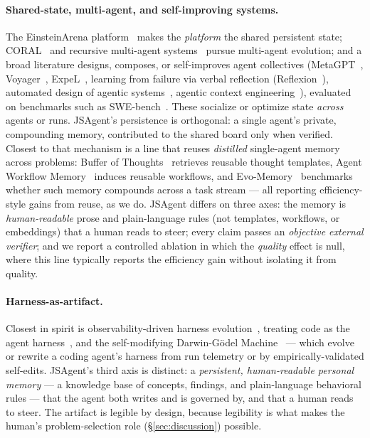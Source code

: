 \documentclass[11pt]{article}
\begin{document}
\paragraph{Shared-state, multi-agent, and self-improving systems.}
The EinsteinArena platform~\cite{bianchi2026einstein,togetherai2026arena} makes the
\emph{platform} the shared persistent state; CORAL~\cite{qu2026coral} and recursive multi-agent
systems~\cite{zou2026recursivemas} pursue multi-agent evolution; and a broad literature
designs, composes, or self-improves agent collectives
(MetaGPT~\cite{hong2023metagpt}, Voyager~\cite{wang2023voyager}, ExpeL~\cite{zhao2023expel},
learning from failure via verbal reflection (Reflexion~\cite{shinn2023reflexion}),
automated design of agentic systems~\cite{hu2024ads}, agentic context
engineering~\cite{zhang2025ace}), evaluated on benchmarks such as
SWE-bench~\cite{jimenez2023swebench}. These socialize or optimize state \emph{across} agents
or runs. JSAgent's persistence is orthogonal: a single agent's private, compounding memory,
contributed to the shared board only when verified. Closest to that mechanism is a line that
reuses \emph{distilled} single-agent memory across problems: Buffer of
Thoughts~\cite{yang2024bufferofthoughts} retrieves reusable thought templates, Agent Workflow
Memory~\cite{wang2024agentworkflowmemory} induces reusable workflows, and
Evo-Memory~\cite{wei2025evomemory} benchmarks whether such memory compounds across a task
stream --- all reporting efficiency-style gains from reuse, as we do. JSAgent differs on three
axes: the memory is \emph{human-readable} prose and plain-language rules (not templates,
workflows, or embeddings) that a human reads to steer; every claim passes an \emph{objective
external verifier}; and we report a controlled ablation in which the \emph{quality} effect is
null, where this line typically reports the efficiency gain without isolating it from quality.

\paragraph{Harness-as-artifact.}
Closest in spirit is observability-driven harness evolution~\cite{lin2026ahe}, treating
code as the agent harness~\cite{ning2026codeharness}, and the self-modifying Darwin-G\"odel
Machine~\cite{zhang2025dgm} --- which evolve or rewrite a coding agent's harness from run
telemetry or by empirically-validated self-edits. JSAgent's third axis is distinct: a \emph{persistent, human-readable
personal memory} --- a knowledge base of concepts, findings, and plain-language behavioral
rules --- that the agent both writes and is governed by, and that a human reads to steer. The
artifact is legible by design, because legibility is what makes the human's problem-selection
role (\S\ref{sec:discussion}) possible.
\end{document}
